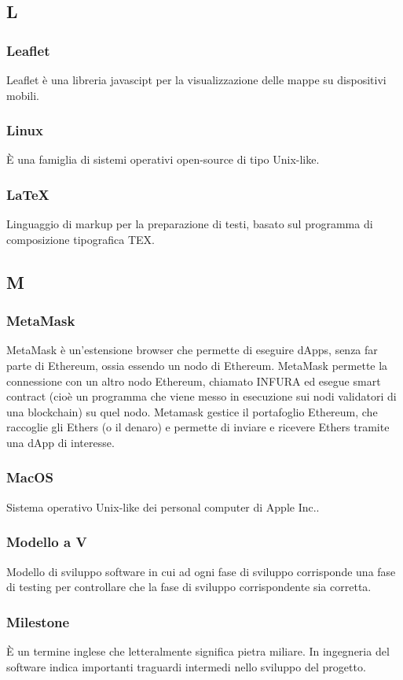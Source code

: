 \subsection*{L}
\subsubsection*{Leaflet} Leaflet è una libreria javascipt per la visualizzazione delle mappe su dispositivi mobili.
\subsubsection*{Linux} È una famiglia di sistemi operativi open-source di tipo Unix-like.
\subsubsection*{\LaTeX} Linguaggio di markup per la preparazione di testi, basato sul programma di composizione tipografica TEX.
\subsection*{M}
\subsubsection*{MetaMask} MetaMask è un'estensione browser che permette di eseguire dApps, senza far parte di Ethereum, ossia essendo un nodo di Ethereum. MetaMask permette la connessione con un altro nodo Ethereum, chiamato INFURA ed esegue smart contract (cioè un programma che viene messo in esecuzione sui nodi validatori di una blockchain) su quel nodo. Metamask gestice il portafoglio Ethereum, che raccoglie gli Ethers (o il denaro) e permette di inviare e ricevere Ethers tramite una dApp di interesse.
\subsubsection*{MacOS} Sistema operativo Unix-like dei personal computer di Apple Inc..
\subsubsection*{Modello a V} Modello di sviluppo software in cui ad ogni fase di sviluppo corrisponde una fase di testing per controllare che la fase di sviluppo corrispondente sia corretta.
\subsubsection*{Milestone} È un termine inglese che letteralmente significa pietra miliare. In ingegneria del software indica importanti traguardi intermedi nello sviluppo del progetto.
